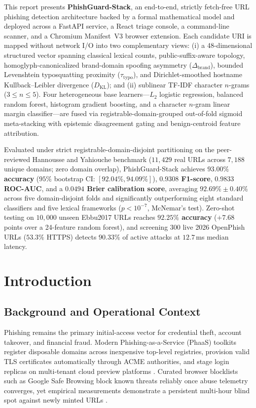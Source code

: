 \documentclass[12pt,a4paper]{report}
\begin{document}
This report presents \textbf{PhishGuard-Stack}, an end-to-end, strictly fetch-free URL phishing detection architecture backed by a formal mathematical model and deployed across a FastAPI service, a React triage console, a command-line scanner, and a Chromium Manifest~V3 browser extension. Each candidate URI is mapped without network I/O into two complementary views: (i) a 48-dimensional structured vector spanning classical lexical counts, public-suffix-aware topology, homoglyph-canonicalized brand-domain spoofing asymmetry ($\Delta_{\text{brand}}$), bounded Levenshtein typosquatting proximity ($\tau_{\text{typo}}$), and Dirichlet-smoothed hostname Kullback--Leibler divergence ($D_{\text{KL}}$); and (ii) sublinear TF-IDF character $n$-grams ($3 \le n \le 5$). Four heterogeneous base learners---$L_2$ logistic regression, balanced random forest, histogram gradient boosting, and a character $n$-gram linear margin classifier---are fused via registrable-domain-grouped out-of-fold sigmoid meta-stacking with epistemic disagreement gating and benign-centroid feature attribution.

Evaluated under strict registrable-domain-disjoint partitioning on the peer-reviewed Hannousse and Yahiouche benchmark ($11{,}429$ real URLs across $7{,}188$ unique domains; zero domain overlap), PhishGuard-Stack achieves \textbf{$93.00\%$ accuracy} ($95\%$ bootstrap CI: $[92.04\%, 94.09\%]$), \textbf{$0.9308$ F1-score}, \textbf{$0.9833$ ROC-AUC}, and a \textbf{$0.0494$ Brier calibration score}, averaging \textbf{$92.69\% \pm 0.40\%$} across five domain-disjoint folds and significantly outperforming eight standard classifiers and five lexical frameworks ($p < 10^{-7}$, McNemar's test). Zero-shot testing on $10{,}000$ unseen Ebbu2017 URLs reaches \textbf{$92.25\%$ accuracy} ($+7.68$ points over a 24-feature random forest), and screening $300$ live 2026 OpenPhish URLs ($53.3\%$ HTTPS) detects \textbf{$90.33\%$} of active attacks at $12.7$\,ms median latency.

\clearpage
\tableofcontents
\clearpage
\listoffigures
\clearpage
\listoftables
\clearpage
{}

\chapter{Introduction}

\section{Background and Operational Context}
Phishing remains the primary initial-access vector for credential theft, account takeover, and financial fraud. Modern Phishing-as-a-Service (PhaaS) toolkits register disposable domains across inexpensive top-level registries, provision valid TLS certificates automatically through ACME authorities, and stage login replicas on multi-tenant cloud preview platforms \cite{sahoo2017,prasad2024}. Curated browser blocklists such as Google Safe Browsing block known threats reliably once abuse telemetry converges, yet empirical measurements demonstrate a persistent multi-hour blind spot against newly minted URLs \cite{sheng2009}.
\end{document}
